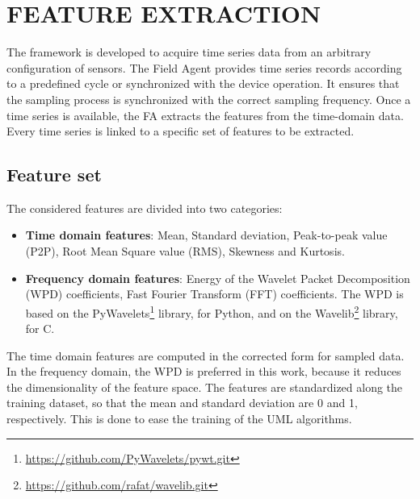 \section{FEATURE EXTRACTION}
The framework is developed to acquire time series data from an arbitrary configuration of sensors. The Field Agent provides time series records according to a predefined cycle or synchronized with the device operation. It ensures that the sampling process is synchronized with the correct sampling frequency. Once a time series is available, the FA extracts the features from the time-domain data. Every time series is linked to a specific set of features to be extracted.

\subsection{Feature set}
The considered features are divided into two categories:
\begin{itemize}
    \item \textbf{Time domain features}: Mean, Standard deviation, Peak-to-peak value (P2P), Root Mean Square value (RMS), Skewness and Kurtosis.
    \item \textbf{Frequency domain features}: Energy of the Wavelet Packet Decomposition (WPD) coefficients, Fast Fourier Transform (FFT) coefficients. The WPD is based on the PyWavelets\footnote{\url{https://github.com/PyWavelets/pywt.git}} library, for Python, and on the Wavelib\footnote{\url{https://github.com/rafat/wavelib.git}} library, for C.
\end{itemize}

The time domain features are computed in the corrected form for sampled data. In the frequency domain, the WPD is preferred in this work, because it reduces the dimensionality of the feature space. The features are standardized along the training dataset, so that the mean and standard deviation are 0 and 1, respectively. This is done to ease the training of the UML algorithms.

